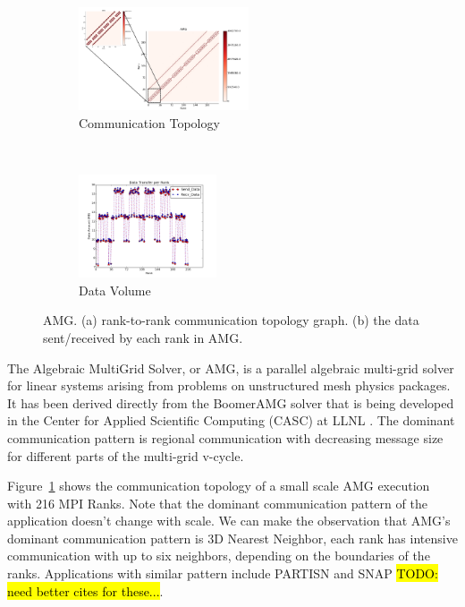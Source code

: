 \documentclass[conference]{IEEEtran}
\newcommand{\TODO}[1]{\hl{TODO: #1}}
\begin{document}
\begin{figure}[t!]
    \centering
    \begin{subfigure}[t]{0.22\textwidth}
        \centering
        \includegraphics[height=1.2in]{figs/appstudy/amg/amg_pip}
        \caption{Communication Topology}
        \label{fig:amg-communication-topology}
    \end{subfigure}%
    ~
    \begin{subfigure}[t]{0.22\textwidth}
        \centering
        \includegraphics[height=1.2in]{figs/appstudy/amg/amg_data_transfer}
        \caption{Data Volume}
        \label{fig:amg-data-trans}
    \end{subfigure}
    \caption{AMG. (a) rank-to-rank communication topology graph. (b) the data sent/received by each rank in AMG.}
\end{figure}

The Algebraic MultiGrid Solver, or AMG, is a parallel algebraic multi-grid solver for linear systems arising from problems on unstructured mesh physics packages. It has been derived directly from the BoomerAMG solver that is being developed in the Center for Applied Scientific Computing (CASC) at LLNL \cite{amg}. The dominant communication pattern is regional communication with decreasing message size for different parts of the multi-grid v-cycle.

Figure~\ref{fig:amg-communication-topology} shows the communication topology of a small scale AMG execution with 216 MPI Ranks. Note that the dominant communication pattern of the application doesn't change with scale. We can make the observation that AMG's dominant communication pattern is 3D Nearest Neighbor, each rank has intensive communication with up to six neighbors, depending on the boundaries of the ranks. Applications with similar pattern include PARTISN\cite{designforwardwebpage} and SNAP \cite{designforwardwebpage} \TODO{need better cites for these...}.
\end{document}
